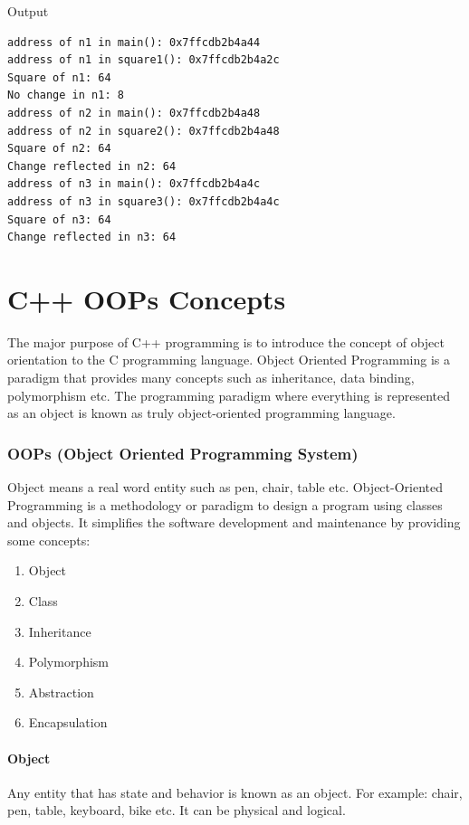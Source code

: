 \documentclass{book}
\begin{document}
Output 

\begin{lstlisting}
address of n1 in main(): 0x7ffcdb2b4a44
address of n1 in square1(): 0x7ffcdb2b4a2c
Square of n1: 64
No change in n1: 8
address of n2 in main(): 0x7ffcdb2b4a48
address of n2 in square2(): 0x7ffcdb2b4a48
Square of n2: 64
Change reflected in n2: 64
address of n3 in main(): 0x7ffcdb2b4a4c
address of n3 in square3(): 0x7ffcdb2b4a4c
Square of n3: 64
Change reflected in n3: 64
\end{lstlisting}

\chapter{C++ OOPs Concepts}

The major purpose of C++ programming is to introduce the concept of object orientation to the C programming language. Object Oriented Programming is a paradigm that provides many concepts such as inheritance, data binding, polymorphism etc. The programming paradigm where everything is represented as an object is known as truly object-oriented programming language. 

\subsection{OOPs (Object Oriented Programming System)}

Object means a real word entity such as pen, chair, table etc. Object-Oriented Programming is a methodology or paradigm to design a program using classes and objects. It simplifies the software development and maintenance by providing some concepts:

\begin{enumerate}
	\item Object
\item Class
\item Inheritance
\item Polymorphism
\item Abstraction
\item Encapsulation
\end{enumerate}

\subsubsection{Object}
Any entity that has state and behavior is known as an object. For example: chair, pen, table, keyboard, bike etc. It can be physical and logical.
\end{document}
